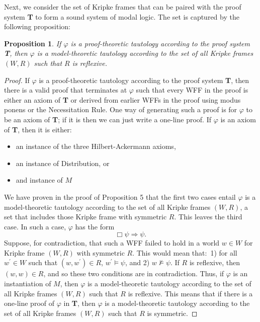 \documentclass[11pt]{article}
\newtheorem{proposition}[theorem]{Proposition}
\theoremstyle{definition}
\theoremstyle{remark}
\begin{document}
Next, we consider the set of Kripke frames that can be paired with the proof system \textbf{T} to form a sound system of modal logic. The set is captured by the following proposition:
\begin{proposition}
    If $\varphi$ is a proof-theoretic tautology according to the proof system \textbf{T}, then $\varphi$ is a model-theoretic tautology according to the set of all Kripke frames $(W,R)$ such that $R$ is reflexive.
\end{proposition}
\begin{proof}
If $\varphi$ is a proof-theoretic tautology according to the proof system \textbf{T}, then there is a valid proof that terminates at $\varphi$ such that every WFF in the proof is either an axiom of \textbf{T} or derived from earlier WFFs in the proof using modus ponens or the Necessitation Rule. One way of generating such a proof is for $\varphi$ to be an axiom of \textbf{T}; if it is then we can just write a one-line proof. If $\varphi$ is an axiom of \textbf{T}, then it is either:
\begin{itemize}
    \item an instance of the three Hilbert-Ackermann axioms,

    \item an instance of Distribution, or

    \item and instance of $M$
\end{itemize}
We have proven in the proof of Proposition 5 that the first two cases entail $\varphi$ is a model-theoretic tautology according to the set of all Kripke frames $(W,R)$, a set that includes those Kripke frame with symmetric $R$. This leaves the third case. In such a case, $\varphi$ has the form
$$\Box\psi\Rightarrow\psi.$$
Suppose, for contradiction, that such a WFF failed to hold in a world $w\in W$ for Kripke frame $(W,R)$ with symmetric $R$. This would mean that:\ 1) for all $w^{\prime}\in W$ such that $(w,w^{\prime})\in R$, $w^{\prime}\vDash \psi$, and 2) $w\not\vDash\psi$. If $R$ is reflexive, then $(w,w)\in R$, and so these two conditions are in contradiction. Thus, if $\varphi$ is an instantiation of $M$, then $\varphi$ is a model-theoretic tautology according to the set of all Kripke frames $(W,R)$ such that $R$ is reflexive. This means that if there is a one-line proof of $\varphi$ in \textbf{T}, then $\varphi$ is a model-theoretic tautology according to the set of all Kripke frames $(W,R)$ such that $R$ is symmetric.\par


\end{proof}
\end{document}
